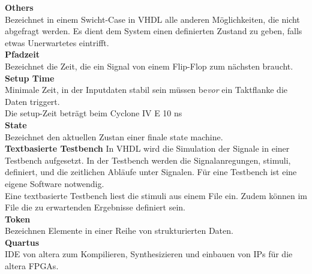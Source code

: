\textbf{Others}\\
Bezeichnet in einem Swicht-Case in VHDL alle anderen Möglichkeiten, die nicht abgefragt werden. Es dient dem System einen definierten Zustand zu geben, falls etwas Unerwartetes eintrifft.\\

\textbf{Pfadzeit}\\
Bezeichnet die Zeit, die ein Signal von einem Flip-Flop zum nächsten braucht.\\

\textbf{Setup Time} \\
Minimale Zeit, in der Inputdaten stabil sein müssen be\textit{vor} ein Taktflanke die Daten triggert.\\
Die setup-Zeit beträgt beim Cyclone IV E 10 ns \cite{Handbook_Altera}\\

\textbf{State}\\
Bezeichnet den aktuellen Zustan einer finale state machine. \\

\textbf{Textbasierte Testbench}
In VHDL wird die Simulation der Signale in einer Testbench aufgesetzt. In der Testbench werden die Signalanregungen, stimuli, definiert, und die zeitlichen Abläufe unter Signalen. Für eine Testbench ist eine eigene Software notwendig.\\
Eine textbasierte Testbench liest die stimuli aus einem File ein. Zudem können im File die zu erwartenden Ergebnisse definiert sein.\\

\textbf{Token}\\
Bezeichnen Elemente in einer Reihe von strukturierten Daten.\\

\textbf{Quartus}\\
IDE von altera zum Kompilieren, Synthesizieren und einbauen von IPs für die altera FPGAs.\\
